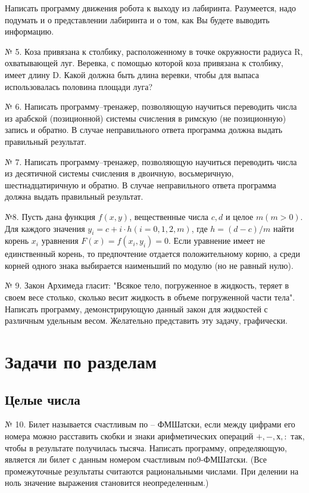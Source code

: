 Написать программу движения робота к выходу из лабиринта. Разумеется, надо подумать и о представлении лабиринта и о том, как Вы будете выводить информацию.


№ 5. Коза привязана к столбику, расположенному в точке окружности радиуса R, охватывающей луг. Веревка, с помощью которой коза привязана к столбику, имеет длину D. Какой должна быть длина веревки, чтобы для выпаса использовалась половина площади луга?

№ 6. Написать программу--тренажер, позволяющую научиться переводить числа из арабской (позиционной) системы счисления в римскую (не позиционную) запись и обратно. В случае неправильного ответа программа должна выдать правильный результат.

№ 7. Написать программу--тренажер, позволяющую научиться переводить числа из десятичной системы счисления в двоичную, восьмеричную, шестнадцатиричную и обратно. В случае неправильного ответа программа должна выдать правильный результат.

№8. Пусть дана функция $f(x,y)$, вещественные числа $c, d$ и целое $m (m>0)$. Для каждого значения $y_i = c + i\cdot h (i= 0,1,2, m)$, где $h = (d-c)/m$ найти корень $x_i$ уравнения $F(x) = f(x_i, y_i) = 0$. Если уравнение имеет не единственный корень, то предпочтение отдается положительному корню, а среди корней одного знака выбирается наименьший по модулю (но не равный нулю).

№ 9. Закон Архимеда гласит: "Всякое тело, погруженное в жидкость, теряет в своем весе столько, сколько весит жидкость в объеме погруженной части тела". Написать программу, демонстрирующую данный закон для жидкостей с различным удельным весом. Желательно представить эту задачу, графически.

\section{Задачи по разделам}

\subsection{Целые числа}

\hspace{7mm} № 10. Билет называется счастливым по -- ФМШатски, если между цифрами его номера можно расставить скобки и знаки арифметических операций $+, -, х , :$ так, чтобы в результате получилась тысяча. Написать программу, определяющую, является ли билет с данным номером счастливым по9-ФМШатски. (Все промежуточные результаты считаются рациональными числами. При делении на ноль значение выражения становится неопределенным.)

